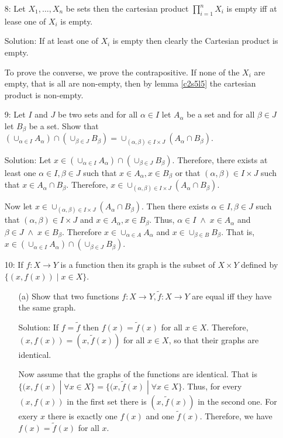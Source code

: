 \begin{enumerate}
\item[8:] Let $X_1, \ldots, X_n$ be sets then the cartesian product
$\prod_{i=1}^n X_i$ is empty iff at lease one of $X_i$ is empty.
\item[Solution:] If at least one of $X_i$ is empty then clearly the
Cartesian product is empty.

To prove the converse, we prove the contrapositive. If none of the $X_i$
are empty, that is all are non-empty, then by lemma \ref{c2s5l5} the
cartesian product is non-empty.

\item[9:] Let $I$ and $J$ be two sets and for all $\alpha \in I$ let
$A_\alpha$ be a set and for all $\beta \in J$ let $B_\beta$ be a set.
Show that $(\cup_{\alpha \in I} A_\alpha) \cap (\cup_{\beta \in J }
B_\beta) = \cup_{(\alpha, \beta) \in I \times J} (A_\alpha \cap B_\beta)$.
\item[Solution:] Let $x \in (\cup_{\alpha \in I} A_\alpha) \cap 
(\cup_{\beta \in J}B_\beta)$. Therefore, there exists at least one $\alpha
\in I, \beta \in J$ such that $x \in A_\alpha, x \in B_\beta$ or that
$(\alpha, \beta) \in I \times J$ such that $x \in A_\alpha \cap B_\beta$.
Therefore, $x \in \cup_{(\alpha, \beta) \in I \times J} (A_\alpha \cap
B_\beta)$.

Now let $x \in \cup_{(\alpha, \beta) \in I \times J} (A_\alpha \cap 
B_\beta)$. Then there exists $\alpha \in I, \beta \in J$ such that
$(\alpha, \beta) \in I \times J$ and $x \in A_\alpha, x \in B_\beta$.
Thus, $\alpha \in I \;\land\; x \in A_\alpha$ and $\beta \in J \;\land\;
x \in B_\beta$. Therefore $x \in \cup_{\alpha \in A} A_\alpha$ and $x
\in \cup_{\beta \in B} B_\beta$. That is, $x \in (\cup_{\alpha \in I} 
A_\alpha) \cap (\cup_{\beta \in J } B_\beta)$.

\item[10:] If $f:X \rightarrow Y$ is a function then its graph is the
subset of $X \times Y$ defined by $\{(x, f(x)) \;|\; x \in X\}$.
\begin{enumerate}
\item[(a)] Show that two functions $f: X \rightarrow Y, \tilde{f}: X
\rightarrow Y$ are equal iff they have the same graph.
\item[Solution:] If $f = \tilde{f}$ then $f(x) = \tilde{f}(x)$ for all 
$x \in X$. Therefore, $(x, f(x)) = (x, \tilde{f}(x))$ for all $x \in X$,
so that their graphs are identical.

Now assume that the graphs of the functions are identical. That is $\{(x,
f(x) \;|\; \forall x \in X\} = \{(x, \tilde{f}(x)\;|\; \forall x \in X\}$.
Thus, for every $(x, f(x))$ in the first set there is $(x, \tilde{f}(x))$
in the second one. For exery $x$ there is exactly one $f(x)$ and one 
$\tilde{f}(x)$. Therefore, we have $f(x) = \tilde{f}(x)$ for all $x$.


\end{enumerate}
\end{enumerate}
